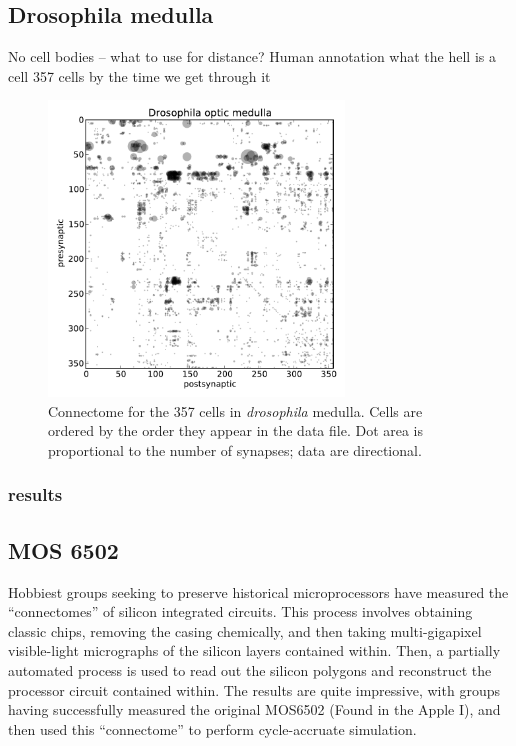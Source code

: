 \documentclass{article}
\begin{document}

\subsection{Drosophila medulla}
\autocite{Takemura2013}
No cell bodies -- what to use for distance? 
Human annotation
what the hell is a cell
357 cells by the time we get through it

\begin{figure}
  \centering 
  \includegraphics[width=0.7\textwidth]{drosophila/adj_comp.pdf}
  \caption{Connectome for the 357 cells in \textit{drosophila} medulla. Cells are ordered by the order they appear in the data file. Dot area is proportional to the number of synapses; data are directional.}
  \label{fig:drosophila_adj}
\end{figure}

\subsubsection{results}

\subsection{MOS 6502}

Hobbiest groups seeking to preserve historical microprocessors have
measured the ``connectomes'' of silicon integrated circuits. This
process involves obtaining classic chips, removing the casing
chemically, and then taking multi-gigapixel visible-light micrographs
of the silicon layers contained within. Then, a partially automated
process is used to read out the silicon polygons and reconstruct the
processor circuit contained within. The results are quite impressive,
with groups having successfully measured the original MOS6502 (Found
in the Apple I), and then used this ``connectome'' to perform
cycle-accruate simulation.
\end{document}
